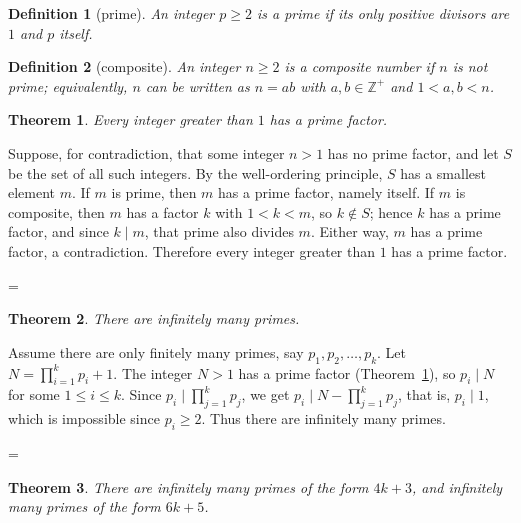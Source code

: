 \documentclass[11pt]{article}
\makeatletter
\theoremstyle{ntstyle}
\newtheorem{theorem}{Theorem}[subsection]
\newtheorem{definition}{Definition}[subsection]
\let\nt@closedisplay\]
\def\nt@guardedclose{\@ifnextchar\par{\nt@closeafterpar}{\@ifnextchar\end{\postdisplaypenalty\@M\nt@closedisplay}{\nt@closedisplay}}}
\def\nt@closeafterpar\par{\@ifnextchar\par{\nt@closeafterpar}{\@ifnextchar\end{\postdisplaypenalty\@M\nt@closedisplay\par}{\nt@closedisplay\par}}}
\renewenvironment{proof}[1][\proofname]{\par
  \pushQED{\qed}\normalfont\topsep\medskipamount\edef\nt@afterproof{\@endparpenalty=\the\@endparpenalty\relax}\@beginparpenalty\@M\@endparpenalty\@M\let\]\nt@guardedclose\trivlist\item[]\textit{#1\@addpunct{.}} \ignorespaces}{\ifvmode\addpenalty\@M\fi\popQED\nt@afterproof\endtrivlist\@endpefalse}
\makeatother
\begin{document}
\begin{definition}[prime]\label{def:2.1.1} An integer $p \ge 2$
	is a prime if its only positive divisors are $1$ and $p$ itself.

\end{definition}
\begin{definition}[composite]\label{def:2.1.2} An integer $n \ge 2$ is a
	composite number if $n$ is not prime; equivalently, $n$ can be written as $n = ab$ with $a, b \in \mathbb{Z}^+$ and $1 < a, b < n$.

\end{definition}
\begin{theorem}\label{thm:2.1.1} Every integer greater than $1$ has
	a prime factor.

\end{theorem}

\begin{proof} Suppose, for contradiction, that some
	integer $n > 1$ has no prime factor, and let $S$ be the set of all
	such integers. By the well-ordering principle, $S$ has a smallest
	element $m$. If $m$ is prime, then $m$ has a prime factor, namely
	itself. If $m$ is composite, then $m$ has a factor
	$k$ with $1 < k < m$, so $k \notin S$; hence $k$ has a prime factor,
	and since $k \mid m$, that prime also divides $m$. Either way, $m$ has
	a prime factor, a contradiction. Therefore every integer greater than
	$1$ has a prime factor.

\end{proof}
\begin{theorem}\label{thm:2.1.2} There are infinitely many primes.

\end{theorem}

\begin{proof} Assume there are only finitely many primes, say $p_1,
		p_2, \ldots, p_k$. Let $N = \prod_{i=1}^{k} p_i + 1$. The integer $N > 1$
	has a prime factor (Theorem~\ref{thm:2.1.1}), so $p_i \mid N$ for some $1 \le
		i \le k$. Since $p_i \mid \prod_{j=1}^{k} p_j$, we get $p_i \mid N -
		\prod_{j=1}^{k} p_j$, that is, $p_i \mid 1$, which is impossible since
	$p_i\ge2$. Thus there are infinitely many primes.

\end{proof}
\begin{theorem}\label{thm:2.1.3}
	There are infinitely many primes of the form $4k+3$, and infinitely many
	primes of the form $6k+5$.

\end{theorem}
\end{document}
